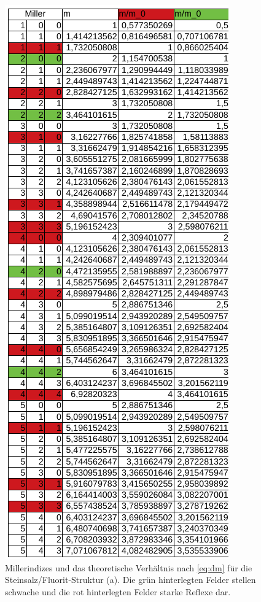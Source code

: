 % 
% 
%


\begin{figure}
  \centering
  \includegraphics{ressources/Steinsalz.png}
  \caption{Millerindizes und das theoretische Verhältnis nach \ref{eq:dm} für die Steinsalz/Fluorit-Struktur (a). Die grün hinterlegten Felder stellen schwache und die rot hinterlegten Felder starke Reflexe dar.}
  \label{fig:Anhang1}
\end{figure}

